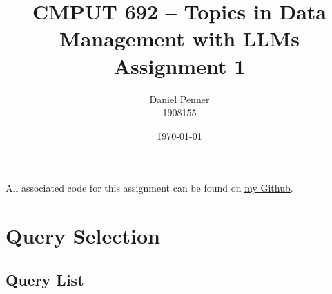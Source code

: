 \documentclass[11pt]{article}
\begin{document}
\title{CMPUT 692 -- Topics in Data Management with LLMs \\ 
Assignment 1}
\author{Daniel Penner \\ 1908155}
\date{\today}
\maketitle

All associated code for this assignment can be found on \href{https://github.com/Daniel-Penner/CMPUT-692-Assignment-1}{\underline{my Github}}.

\section{Query Selection}

\subsection{Query List}
\end{document}
